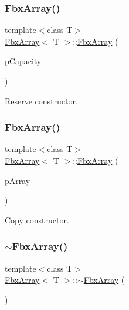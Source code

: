 \subsubsection{\texorpdfstring{Fbx\+Array()}{FbxArray()}\hspace{0.1cm}{\footnotesize\ttfamily [2/3]}}
{\footnotesize\ttfamily template$<$class T$>$ \\
\hyperlink{class_fbx_array}{Fbx\+Array}$<$ T $>$\+::\hyperlink{class_fbx_array}{Fbx\+Array} (\begin{DoxyParamCaption}\item[{const int}]{p\+Capacity }\end{DoxyParamCaption})}



Reserve constructor. 

\mbox{\label{class_fbx_array_a2ec010767ac567804d4c4174048133b3}} 
\subsubsection{\texorpdfstring{Fbx\+Array()}{FbxArray()}\hspace{0.1cm}{\footnotesize\ttfamily [3/3]}}
{\footnotesize\ttfamily template$<$class T$>$ \\
\hyperlink{class_fbx_array}{Fbx\+Array}$<$ T $>$\+::\hyperlink{class_fbx_array}{Fbx\+Array} (\begin{DoxyParamCaption}\item[{const \hyperlink{class_fbx_array}{Fbx\+Array}$<$ T $>$ \&}]{p\+Array }\end{DoxyParamCaption})}



Copy constructor. 

\mbox{\label{class_fbx_array_aa059390701fad11dba2a073240480e1c}} 
\subsubsection{\texorpdfstring{$\sim$\+Fbx\+Array()}{~FbxArray()}}
{\footnotesize\ttfamily template$<$class T$>$ \\
\hyperlink{class_fbx_array}{Fbx\+Array}$<$ T $>$\+::$\sim$\hyperlink{class_fbx_array}{Fbx\+Array} (\begin{DoxyParamCaption}{ }\end{DoxyParamCaption})}

